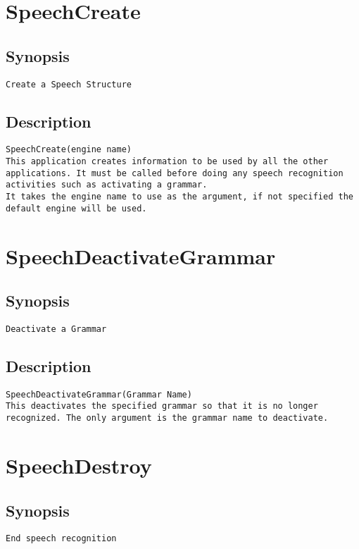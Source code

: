 \section{SpeechCreate}
\subsection{Synopsis}
\begin{verbatim}
Create a Speech Structure
\end{verbatim}
\subsection{Description}
\begin{verbatim}
SpeechCreate(engine name)
This application creates information to be used by all the other applications. It must be called before doing any speech recognition activities such as activating a grammar.
It takes the engine name to use as the argument, if not specified the default engine will be used.

\end{verbatim}


\section{SpeechDeactivateGrammar}
\subsection{Synopsis}
\begin{verbatim}
Deactivate a Grammar
\end{verbatim}
\subsection{Description}
\begin{verbatim}
SpeechDeactivateGrammar(Grammar Name)
This deactivates the specified grammar so that it is no longer recognized. The only argument is the grammar name to deactivate.

\end{verbatim}


\section{SpeechDestroy}
\subsection{Synopsis}
\begin{verbatim}
End speech recognition
\end{verbatim}
